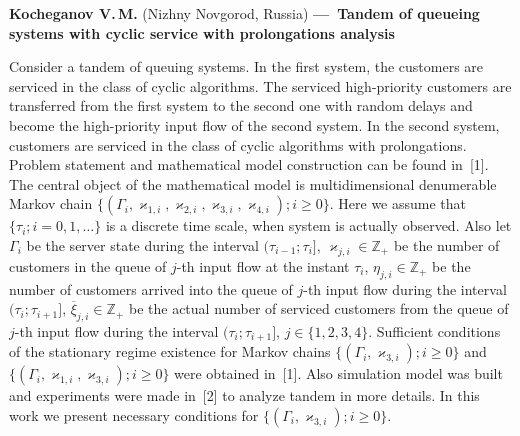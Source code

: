 \documentclass{article}
\begin{document}
\makeatletter
\renewcommand{\@makefnmark}{}
\makeatother

%

{\bf Kocheganov V.\,M.} (Nizhny Novgorod, Russia) {\bf ---~Tandem of queueing systems with cyclic service with prolongations analysis}   

Consider a tandem of queuing systems. In the first system, the customers are serviced in the class of cyclic algorithms. The serviced high-priority customers are transferred from the first system to the second one  with random delays and become the high-priority input flow of the second system. In the second system, customers are serviced in the class of cyclic algorithms with prolongations. Problem statement and mathematical model construction can be found in~[1]. The central object of the mathematical model is  multidimensional denumerable Markov chain ${\{(\Gamma_i, \varkappa_{1,i}, \varkappa_{2,i}, \varkappa_{3,i}, \varkappa_{4,i});  i \geqslant 0\}}$. Here we assume that $\{\tau_i; i = 0, 1,\ldots\}$ is a discrete time scale, when system is actually observed. Also let 
$\Gamma_i$ be the server state
during the interval $(\tau_{i-1};\tau_i]$, $\varkappa_{j,i} \in \mathbb{Z}_+ $ be the number of customers in
the queue of $j$-th input flow at the instant $\tau_i$, $\eta_{j,i} \in \mathbb{Z}_+$ be the number of customers
arrived into the queue of $j$-th input flow  during the interval $(\tau_{i};\tau_{i+1}]$,  $\overline{\xi}_{j,i}\in \mathbb{Z}_+$ be the actual number of 
serviced customers from the queue of  $j$-th input flow during the interval $(\tau_{i};\tau_{i+1}]$, $j\in
\{1,2,3,4\}$. Sufficient conditions of the stationary regime existence for Markov chains  ${\{(\Gamma_i, \varkappa_{3,i});  i \geqslant 0\}}$ and ${\{(\Gamma_i, \varkappa_{1,i}, \varkappa_{3,i});  i \geqslant 0\}}$ were obtained in~[1]. Also simulation model was built and experiments were made in~[2] to analyze tandem in more details. In this work we present necessary conditions for ${\{(\Gamma_i, \varkappa_{3,i});  i \geqslant 0\}}$.
\end{document}
